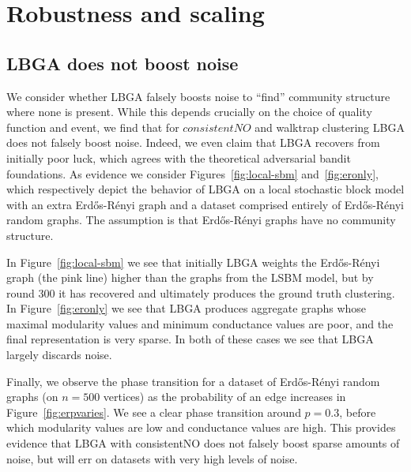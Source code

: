 \documentclass{IEEEtran}
\newcommand{\er}{Erd\H{o}s-R\'{e}nyi }
\begin{document}
\section{Robustness and scaling}
\label{sec:additional-analysis}

\subsection{LBGA does not boost noise}\label{sec:boostnoise} We consider
whether LBGA falsely boosts noise to ``find'' community structure where none is
present. While this depends crucially on the choice of quality function and
event, we find that for $consistentNO$ and walktrap clustering LBGA does not
falsely boost noise. Indeed, we even claim that LBGA recovers from initially
poor luck, which agrees with the theoretical adversarial bandit foundations. As
evidence we consider Figures~\ref{fig:local-sbm} and~\ref{fig:eronly}, which
respectively depict the behavior of LBGA on a local stochastic block model with
an extra \er graph and a dataset comprised entirely of \er random graphs. The
assumption is that \er graphs have no community structure.

In Figure~\ref{fig:local-sbm} we see that initially LBGA weights the \er graph
(the pink line) higher than the graphs from the LSBM model, but by round 300 it
has recovered and ultimately produces the ground truth clustering. In
Figure~\ref{fig:eronly} we see that LBGA produces aggregate graphs whose maximal
modularity values and minimum conductance values are poor, and the final
representation is very sparse. In both of these cases we see that LBGA largely
discards noise. 

Finally, we observe the phase transition for a dataset of \er random graphs (on
$n=500$ vertices) as the probability of an edge increases in
Figure~\ref{fig:erpvaries}. We see a clear phase transition around $p = 0.3$,
before which modularity values are low and conductance values are high. This
provides evidence that LBGA with consistentNO does not falsely boost sparse
amounts of noise, but will err on datasets with very high levels of noise.
\end{document}

